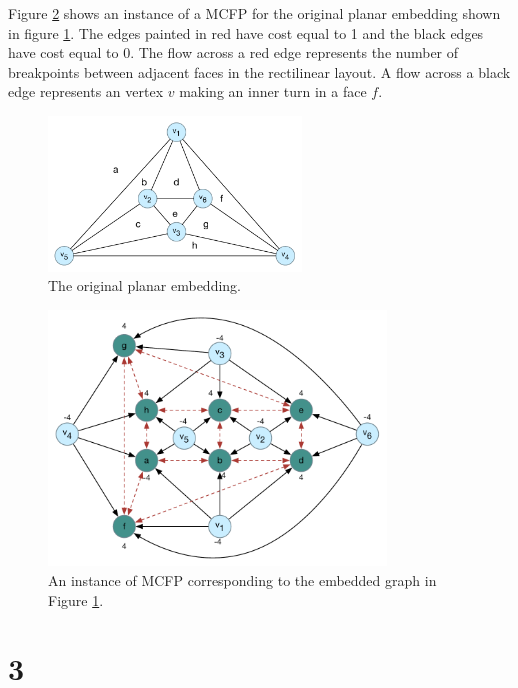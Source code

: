 \documentclass[12pt]{article}
\begin{document}
Figure \ref{fig:mcfp_instance} shows an instance of a MCFP for the original planar embedding shown in figure \ref{fig:planar_embedding}. The edges painted in red have cost equal to 1 and the black edges have cost equal to 0. The flow across a red edge represents the number of breakpoints between adjacent faces in the rectilinear layout. A flow across a black edge represents an vertex $v$ making an inner turn in a face $f$.

\begin{figure}[h]
  \centering
    \includegraphics[width=0.6\textwidth]{figures/e2_5_planar_embedding}
  \caption{The original planar embedding.}
  \label{fig:planar_embedding}
\end{figure}

\begin{figure}[h]
  \centering
    \includegraphics[width=0.8\textwidth]{figures/e2_5}
  \caption{An instance of MCFP corresponding to the embedded graph in Figure \ref{fig:planar_embedding}.}
  \label{fig:mcfp_instance}
\end{figure}

\section*{3}
\end{document}
